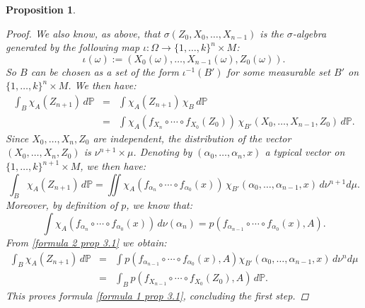 \documentclass[a4paper]{article}
\theoremstyle{plain}
\newtheorem{prop} [theorem]{Proposition}
\theoremstyle{definition}
\begin{document}
\begin{prop}
\begin{proof}
            We also know, as above, that $\sigma(Z_{0},X_{0},\dots,X_{n-1})$ is the $\sigma$-algebra generated by the following map $\iota: \Omega \to \{1,\dots,k\}^{n}\times M$:
			\begin{equation*}
				\iota(\omega) := \left(X_{0}(\omega),\dots,X_{n-1}(\omega),Z_{0}(\omega)\right).
			\end{equation*}
			So $B$ can be chosen as a set of the form $\iota^{-1}(B')$ for some measurable set $B'$ on $\{1,\dots,k\}^{n}\times M$. We then have:
			\begin{eqnarray*}
				\int_{B}\chi_{A}(Z_{n+1})\,d\mathbb{P} &=& \int\chi_{A}(Z_{n+1})\,\chi_{B}\,d\mathbb{P} \\
				&=& \int\chi_{A}(f_{X_{n}}\circ\cdots\circ f_{X_{0}}(Z_{0}))\,\chi_{B'}(X_{0},\dots,X_{n-1},Z_{0})\,d\mathbb{P}.
			\end{eqnarray*}
			Since $X_{0},\dots,X_{n},Z_{0}$ are independent, the distribution of the vector $(X_{0},\dots,X_{n},Z_{0})$ is $\nu^{n+1}\times\mu$. Denoting by $(\alpha_{0},\dots,\alpha_{n},x)$ a typical vector on $\{1,\dots,k\}^{n+1}\times M$, we then have:
			\begin{equation}\label{formula 2 prop 3.1}
				\int_{B}\chi_{A}(Z_{n+1})\,d\mathbb{P} = \iint\chi_{A}(f_{\alpha_{n}}\circ\cdots\circ f_{\alpha_{0}}(x))\,\chi_{B'}(\alpha_{0},\dots,\alpha_{n-1},x)\,d\nu^{n+1}d\mu.
			\end{equation}
			Moreover, by definition of $p$, we know that:
			\begin{equation*}
				\int\chi_{A}(f_{\alpha_{n}}\circ\cdots\circ f_{\alpha_{0}}(x))\,d\nu(\alpha_{n}) = p(f_{\alpha_{n-1}}\circ\cdots\circ f_{\alpha_{0}}(x),A).
			\end{equation*}
			From \eqref{formula 2 prop 3.1} we obtain:
			\begin{eqnarray*}
				\int_{B}\chi_{A}(Z_{n+1})\,d\mathbb{P} &=& \int p(f_{\alpha_{n-1}}\circ\cdots\circ f_{\alpha_{0}}(x),A)\chi_{B'}(\alpha_{0},\dots,\alpha_{n-1},x)\,d\nu^{n}d\mu \\
				&=& \int_{B}p(f_{X_{n-1}}\circ\cdots\circ f_{X_{0}}(Z_{0}),A)\,d\mathbb{P}.
			\end{eqnarray*}
			This proves formula \eqref{formula 1 prop 3.1}, concluding the first step.
			

\end{proof}
\end{prop}
\end{document}
